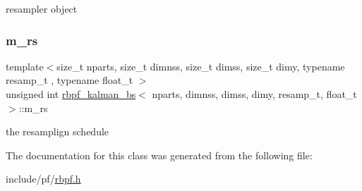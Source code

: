 resampler object \mbox{\label{classrbpf__kalman__bs_a0d8b3393bb7cb301a6719e56d2c646a9}} 
\subsubsection{\texorpdfstring{m\+\_\+rs}{m\_rs}}
{\footnotesize\ttfamily template$<$size\+\_\+t nparts, size\+\_\+t dimnss, size\+\_\+t dimss, size\+\_\+t dimy, typename resamp\+\_\+t , typename float\+\_\+t $>$ \\
unsigned int \hyperlink{classrbpf__kalman__bs}{rbpf\+\_\+kalman\+\_\+bs}$<$ nparts, dimnss, dimss, dimy, resamp\+\_\+t, float\+\_\+t $>$\+::m\+\_\+rs\hspace{0.3cm}{\ttfamily [private]}}

the resamplign schedule 

The documentation for this class was generated from the following file\+:\begin{DoxyCompactItemize}
\item 
include/pf/\hyperlink{rbpf_8h}{rbpf.\+h}\end{DoxyCompactItemize}
